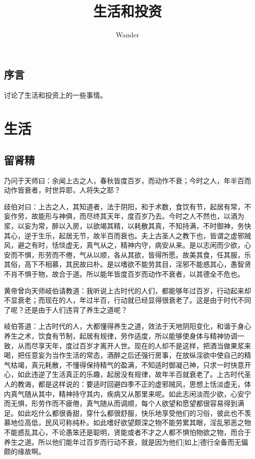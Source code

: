 \documentclass[12pt,oneside]{book}
\title{生活和投资}
\author{Wander}
\begin{document}
\makemytitleA


\frontmatter 
{}
\chapter*{序言}
讨论了生活和投资上的一些事情。

\setcounter{tocdepth}{2}    
\tableofcontents



\mainmatter



\part{生活}



\chapter{留肾精}

\begin{bookref}[frametitle={\cite{黄帝内经}}]
[黄帝]乃问于天师曰：余闻上古之人，春秋皆度百岁，而动作不衰；今时之人，年半百而动作皆衰者，时世异耶，人将失之耶？

歧伯对曰：上古之人，其知道者，法于阴阳，和于术数，食饮有节，起居有常，不妄作劳，故能形与神俱，而尽终其天年，度百岁乃去。今时之人不然也，以酒为浆，以妄为常，醉以入房，以欲竭其精，以耗散其真，不知持满，不时御神，务快其心，逆于生乐，起居无节，故半百而衰也。夫上古圣人之教下也，皆谓之虚邪贼风，避之有时，恬惔虚无，真气从之，精神内守，病安从来。是以志闲而少欲，心安而不惧，形劳而不倦，气从以顺，各从其欲，皆得所愿。故美其食，任其服，乐其俗，高下不相慕，其民故曰朴。是以嗜欲不能劳其目，淫邪不能惑其心，愚智贤不肖不惧于物，故合于道。所以能年皆度百岁而动作不衰者，以其德全不危也。
\end{bookref}
 
黄帝曾向天师岐伯请教道：我听说上古时代的人们，都能够年过百岁，行动起来却不显衰老；而现在的人，年过半百，行动就已经显得很衰老了。这是由于时代不同了呢？还是由于人们违背了养生之道呢？

岐伯答道：上古时代的人，大都懂得养生之道，效法于天地阴阳变化，和谐于身心养生之术，饮食有节制，起居有规律，劳作适度，所以能够使身体与精神协调一致，从而尽享天年，度过百岁才离开人世。现在的人却不是这样，把酒当做果浆来喝，把任意妄为当作生活的常态，酒醉之后还强行房事，在放纵淫欲中使自己的精气枯竭，真元耗散，不懂得保持精气的盈满，不知适时御凝己神，只求一时快意开心，如此违逆了生活真正的乐趣，起居没有规律，故年半百就衰老了。上古时代圣人的教诲，都是这样说的：要适时回避四季不正的虚邪贼风，思想上恬淡虚无，体内真气随从其中，精神持守其内，疾病又从那里来呢。如此志闲淡而少欲，心安宁而无惧，形劳作而不疲倦，真气随从而调顺，每个人欲望和愿望都很容易得到满足。如此吃什么都很香甜，穿什么都很舒服，快乐地享受他们的习俗，彼此也不羡慕地位高低，民风可称纯朴。如此嗜好欲望颇深之物不能劳累其眼，淫乱邪恶之物不能惑乱其心，不论愚笨还是聪明，贤能或者不才之人都不惧怕物欲之物，而合于养生之道。所以他们能年过百岁而行动不衰，就是因为他们[如上]德行全备而无偏颇的缘故啊。
\end{document}

